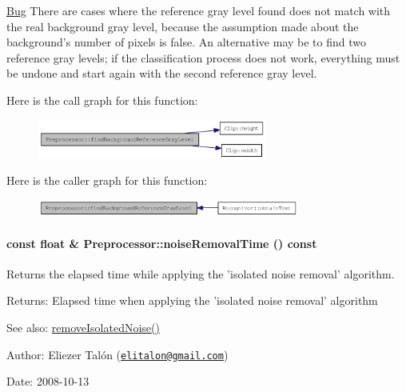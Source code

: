 \begin{Desc}
\item[\hyperlink{bug__bug000001}{Bug}]There are cases where the reference gray level found does not match with the real background gray level, because the assumption made about the background's number of pixels is false. An alternative may be to find two reference gray levels; if the classification process does not work, everything must be undone and start again with the second reference gray level. \end{Desc}


Here is the call graph for this function:\nopagebreak
\begin{figure}[H]
\begin{center}
\leavevmode
\includegraphics[width=213pt]{class_preprocessor_a941f81382bd8e235e4dd12481342be4_cgraph}
\end{center}
\end{figure}


Here is the caller graph for this function:\nopagebreak
\begin{figure}[H]
\begin{center}
\leavevmode
\includegraphics[width=244pt]{class_preprocessor_a941f81382bd8e235e4dd12481342be4_icgraph}
\end{center}
\end{figure}
\hypertarget{class_preprocessor_ff8eee937760e42c0c2bea307849ada1}{
\paragraph[{noiseRemovalTime}]{\setlength{\rightskip}{0pt plus 5cm}const float \& Preprocessor::noiseRemovalTime () const}\hfill}
\label{class_preprocessor_ff8eee937760e42c0c2bea307849ada1}


Returns the elapsed time while applying the 'isolated noise removal' algorithm. 

\begin{Desc}
\item[Returns:]Elapsed time when applying the 'isolated noise removal' algorithm\end{Desc}
\begin{Desc}
\item[See also:]\hyperlink{class_preprocessor_a3e047486a0a80f2103f51d7141e41c5}{removeIsolatedNoise()}\end{Desc}
\begin{Desc}
\item[Author:]Eliezer Talón (\href{mailto:elitalon@gmail.com}{\tt elitalon@gmail.com}) \end{Desc}
\begin{Desc}
\item[Date:]2008-10-13 \end{Desc}



